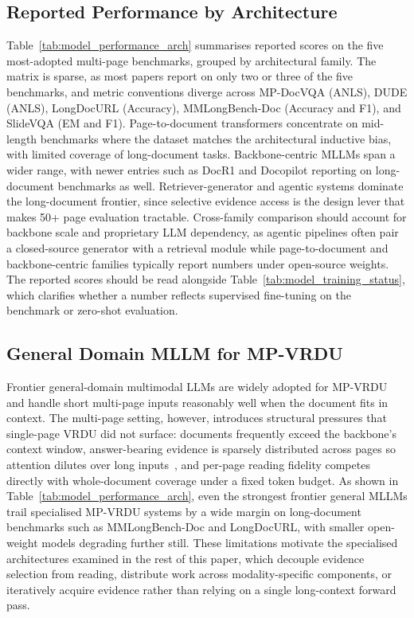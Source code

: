 \documentclass[11pt]{article}
\begin{document}
\subsection{Reported Performance by Architecture}
\label{app:performance}
Table~\ref{tab:model_performance_arch} summarises reported scores on the five most-adopted multi-page benchmarks, grouped by architectural family. The matrix is sparse, as most papers report on only two or three of the five benchmarks, and metric conventions diverge across MP-DocVQA (ANLS), DUDE (ANLS), LongDocURL (Accuracy), MMLongBench-Doc (Accuracy and F1), and SlideVQA (EM and F1). Page-to-document transformers concentrate on mid-length benchmarks where the dataset matches the architectural inductive bias, with limited coverage of long-document tasks. Backbone-centric MLLMs span a wider range, with newer entries such as DocR1 and Docopilot reporting on long-document benchmarks as well. Retriever-generator and agentic systems dominate the long-document frontier, since selective evidence access is the design lever that makes 50+ page evaluation tractable. Cross-family comparison should account for backbone scale and proprietary LLM dependency, as agentic pipelines often pair a closed-source generator with a retrieval module while page-to-document and backbone-centric families typically report numbers under open-source weights. The reported scores should be read alongside Table~\ref{tab:model_training_status}, which clarifies whether a number reflects supervised fine-tuning on the benchmark or zero-shot evaluation.

\subsection{General Domain MLLM for MP-VRDU} 
\label{app:general-MLLM}
Frontier general-domain multimodal LLMs are widely adopted for MP-VRDU and handle short multi-page inputs reasonably well when the document fits in context. The multi-page setting, however, introduces structural pressures that single-page VRDU did not surface: documents frequently exceed the backbone's context window, answer-bearing evidence is sparsely distributed across pages so attention dilutes over long inputs~\cite{liu2024lost}, and per-page reading fidelity competes directly with whole-document coverage under a fixed token budget. As shown in Table~\ref{tab:model_performance_arch}, even the strongest frontier general MLLMs trail specialised MP-VRDU systems by a wide margin on long-document benchmarks such as MMLongBench-Doc and LongDocURL, with smaller open-weight models degrading further still. These limitations motivate the specialised architectures examined in the rest of this paper, which decouple evidence selection from reading, distribute work across modality-specific components, or iteratively acquire evidence rather than relying on a single long-context forward pass.
\end{document}
